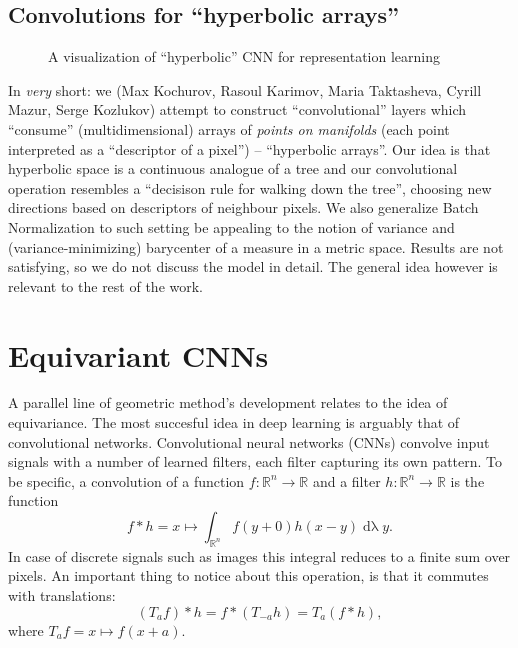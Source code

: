 \subsection{Convolutions for ``hyperbolic arrays''} \label{sec:hconv}

\begin{figure}[ht]\center
{}
\caption{A visualization of ``hyperbolic'' CNN for representation learning}
\end{figure}

In \emph{very} short: we (Max Kochurov, Rasoul Karimov, Maria Taktasheva,
Cyrill Mazur, Serge Kozlukov) attempt to construct ``convolutional'' layers
which ``consume'' (multidimensional) arrays of \emph{points on manifolds} (each
point interpreted as a ``descriptor of a pixel'') -- ``hyperbolic arrays''. Our
idea is that hyperbolic space is a continuous analogue of a tree and our
convolutional operation resembles a ``decisison rule for walking down the
tree'', choosing new directions based on descriptors of neighbour pixels. We
also generalize Batch Normalization to such setting be appealing to the notion
of variance and (variance-minimizing) barycenter of a measure in a metric
space. Results are not satisfying, so we do not discuss the model in detail.
The general idea however is relevant to the rest of the work.

\section{Equivariant CNNs} \label{sec:equivariant}

A parallel line of geometric method's development relates to the idea of
equivariance. The most succesful idea in deep learning is arguably that of
convolutional networks. Convolutional neural networks (CNNs) convolve
input signals with a number of learned filters, each filter capturing
its own pattern. To be specific, a convolution of a function \( f: \mathbb{R}^n
\to \mathbb{R} \) and a filter \( h: \mathbb{R}^n \to \mathbb{R} \) is the
function~\cite{feichtingerFAHA}
\[ f*h = x \mapsto \int_{\mathbb{R}^n} f(y + 0) h(x-y)
\operatorname{d\lambda} y. \]
In case of discrete signals such as images this
integral reduces to a finite sum over pixels. An important thing to notice
about this operation, is that it commutes with translations:
\[ (T_a f) * h = f * (T_{-a} h) = T_a (f * h), \]
where \( T_a f = x \mapsto f(x + a) \).

